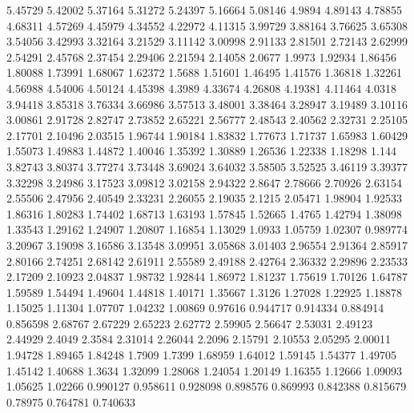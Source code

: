 5.45729      5.42002      5.37164      5.31272      5.24397      5.16664      5.08146      4.9894      4.89143      4.78855      4.68311      4.57269      4.45979      4.34552      4.22972      4.11315      3.99729      3.88164      3.76625      3.65308      3.54056      3.42993      3.32164      3.21529      3.11142      3.00998      2.91133      2.81501      2.72143      2.62999      2.54291      2.45768      2.37454      2.29406      2.21594      2.14058      2.0677      1.9973      1.92934      1.86456      1.80088      1.73991      1.68067      1.62372      1.5688      1.51601      1.46495      1.41576      1.36818      1.32261      
4.56988      4.54006      4.50124      4.45398      4.3989      4.33674      4.26808      4.19381      4.11464      4.0318      3.94418      3.85318      3.76334      3.66986      3.57513      3.48001      3.38464      3.28947      3.19489      3.10116      3.00861      2.91728      2.82747      2.73852      2.65221      2.56777      2.48543      2.40562      2.32731      2.25105      2.17701      2.10496      2.03515      1.96744      1.90184      1.83832      1.77673      1.71737      1.65983      1.60429      1.55073      1.49883      1.44872      1.40046      1.35392      1.30889      1.26536      1.22338      1.18298      1.144      
3.82743      3.80374      3.77274      3.73448      3.69024      3.64032      3.58505      3.52525      3.46119      3.39377      3.32298      3.24986      3.17523      3.09812      3.02158      2.94322      2.8647      2.78666      2.70926      2.63154      2.55506      2.47956      2.40549      2.33231      2.26055      2.19035      2.1215      2.05471      1.98904      1.92533      1.86316      1.80283      1.74402      1.68713      1.63193      1.57845      1.52665      1.4765      1.42794      1.38098      1.33543      1.29162      1.24907      1.20807      1.16854      1.13029      1.0933      1.05759      1.02307      0.989774      
3.20967      3.19098      3.16586      3.13548      3.09951      3.05868      3.01403      2.96554      2.91364      2.85917      2.80166      2.74251      2.68142      2.61911      2.55589      2.49188      2.42764      2.36332      2.29896      2.23533      2.17209      2.10923      2.04837      1.98732      1.92844      1.86972      1.81237      1.75619      1.70126      1.64787      1.59589      1.54494      1.49604      1.44818      1.40171      1.35667      1.3126      1.27028      1.22925      1.18878      1.15025      1.11304      1.07707      1.04232      1.00869      0.97616      0.944717      0.914334      0.884914      0.856598      
2.68767      2.67229      2.65223      2.62772      2.59905      2.56647      2.53031      2.49123      2.44929      2.4049      2.3584      2.31014      2.26044      2.2096      2.15791      2.10553      2.05295      2.00011      1.94728      1.89465      1.84248      1.7909      1.7399      1.68959      1.64012      1.59145      1.54377      1.49705      1.45142      1.40688      1.3634      1.32099      1.28068      1.24054      1.20149      1.16355      1.12666      1.09093      1.05625      1.02266      0.990127      0.958611      0.928098      0.898576      0.869993      0.842388      0.815679      0.78975      0.764781      0.740633      
